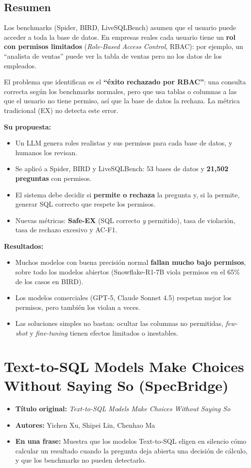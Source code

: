 \documentclass[11pt,a4paper]{article}
\newcommand{\ficha}[5]{%
  \begin{itemize}[leftmargin=*, label={}]
    \item \textbf{Título original:} \textit{#1}
    \item \textbf{Autores:} #2
    \item \textbf{En una frase:} #5
  \end{itemize}
}
\begin{document}
\subsection*{Resumen}
Los benchmarks (Spider, BIRD, LiveSQLBench) asumen que el usuario puede acceder a toda la base de datos. En empresas reales cada usuario tiene un \textbf{rol con permisos limitados} (\textit{Role-Based Access Control}, RBAC): por ejemplo, un ``analista de ventas'' puede ver la tabla de ventas pero no los datos de los empleados.

El problema que identifican es el \textbf{``éxito rechazado por RBAC''}: una consulta correcta según los benchmarks normales, pero que usa tablas o columnas a las que el usuario no tiene permiso, así que la base de datos la rechaza. La métrica tradicional (EX) no detecta este error.

\textbf{Su propuesta:}
\begin{itemize}
  \item Un LLM genera roles realistas y sus permisos para cada base de datos, y humanos los revisan.
  \item Se aplicó a Spider, BIRD y LiveSQLBench: 53 bases de datos y \textbf{21{,}502 preguntas} con permisos.
  \item El sistema debe decidir si \textbf{permite o rechaza} la pregunta y, si la permite, generar SQL correcto que respete los permisos.
  \item Nuevas métricas: \textbf{Safe-EX} (SQL correcto \textit{y} permitido), tasa de violación, tasa de rechazo excesivo y AC-F1.
\end{itemize}

\textbf{Resultados:}
\begin{itemize}
  \item Muchos modelos con buena precisión normal \textbf{fallan mucho bajo permisos}, sobre todo los modelos abiertos (Snowflake-R1-7B viola permisos en el 65\% de los casos en BIRD).
  \item Los modelos comerciales (GPT-5, Claude Sonnet 4.5) respetan mejor los permisos, pero también los violan a veces.
  \item Las soluciones simples no bastan: ocultar las columnas no permitidas, \textit{few-shot} y \textit{fine-tuning} tienen efectos limitados o inestables.
\end{itemize}

\section{Text-to-SQL Models Make Choices Without Saying So (SpecBridge)}
\ficha
  {Text-to-SQL Models Make Choices Without Saying So}
  {Yichen Xu, Shipei Lin, Chenhao Ma}
  {University of California, Berkeley y The Chinese University of Hong Kong, Shenzhen}
  {arXiv:2611.04318v1 (preprint), noviembre 2026}
  {Muestra que los modelos Text-to-SQL eligen en silencio cómo calcular un resultado cuando la pregunta deja abierta una decisión de cálculo, y que los benchmarks no pueden detectarlo.}
\end{document}
